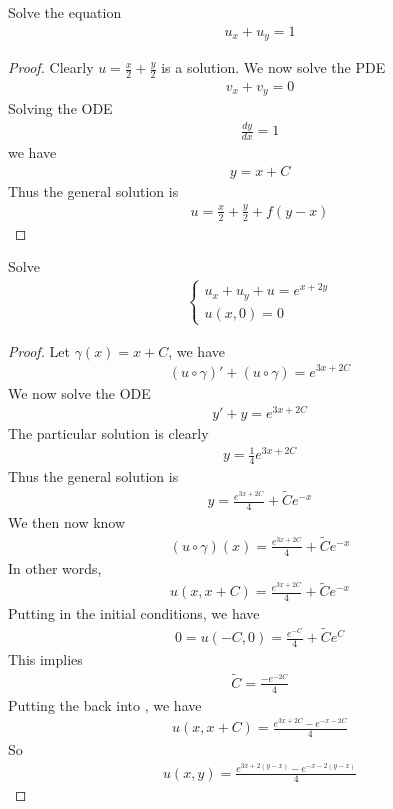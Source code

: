 \documentclass{report}
\begin{document}
\begin{question}{}{}
Solve the equation 
\begin{align*}
u_x+u_y=1
\end{align*}
\end{question}
\begin{proof}
Clearly $u=\frac{x}{2}+\frac{y}{2}$ is a solution. We now solve the PDE 
\begin{align*}
v_x+v_y=0
\end{align*}
Solving the ODE 
\begin{align*}
\frac{dy}{dx}=1
\end{align*}
we have 
\begin{align*}
y=x+C
\end{align*}
Thus the general solution is 
\begin{align*}
u=\frac{x}{2}+\frac{y}{2}+ f(y-x)
\end{align*}


\end{proof}
\begin{question}{}{}
Solve 
\begin{align*}
\begin{cases}
  u_x+u_y+u = e^{x+2y}\\
  u(x,0)=0
\end{cases}
\end{align*}
\end{question}
\begin{proof}
Let $\gamma (x)=x+C$, we have 
\begin{align*}
  (u\circ \gamma )'+(u\circ \gamma )= e^{3x+2C}
\end{align*}
We now solve the ODE 
\begin{align*}
y'+y=e^{3x+2C}
\end{align*}
The particular solution is clearly 
\begin{align*}
y=\frac{1}{4}e^{3x+2C}
\end{align*}
Thus the general solution is 
\begin{align*}
y=\frac{e^{3x+2C}}{4}+ \tilde{C}e^{-x} 
\end{align*}
We then now know 
\begin{align}
\label{uo}
  (u\circ \gamma )(x)= \frac{e^{3x+2C}}{4}+\tilde{C}e^{-x} 
\end{align}
In other words, 
\begin{align*}
u(x,x+C)= \frac{e^{3x+2C}}{4}+ \tilde{C}e^{-x} 
\end{align*}
Putting in the initial conditions, we have
\begin{align*}
0=u(-C,0)= \frac{e^{-C}}{4}+ \tilde{C}e^C 
\end{align*}
This implies 
\begin{align*}
\tilde{C}=\frac{-e^{-2C}}{4} 
\end{align*}
Putting the back into , we have 
\begin{align*}
u(x,x+C)= \frac{e^{3x+2C}- e^{-x-2C}}{4}
\end{align*}
So 
\begin{align*}
u(x,y)=\frac{e^{3x+2(y-x)}-e^{-x-2(y-x)}}{4}
\end{align*}
\end{proof}
\end{document}
